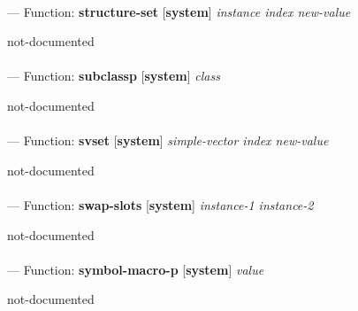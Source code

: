 \paragraph{}
\label{SYSTEM:STRUCTURE-SET}
--- Function: \textbf{structure-set} [\textbf{system}] \textit{instance index new-value}

\begin{adjustwidth}{5em}{5em}
not-documented
\end{adjustwidth}

\paragraph{}
\label{SYSTEM:SUBCLASSP}
--- Function: \textbf{subclassp} [\textbf{system}] \textit{class}

\begin{adjustwidth}{5em}{5em}
not-documented
\end{adjustwidth}

\paragraph{}
\label{SYSTEM:SVSET}
--- Function: \textbf{svset} [\textbf{system}] \textit{simple-vector index new-value}

\begin{adjustwidth}{5em}{5em}
not-documented
\end{adjustwidth}

\paragraph{}
\label{SYSTEM:SWAP-SLOTS}
--- Function: \textbf{swap-slots} [\textbf{system}] \textit{instance-1 instance-2}

\begin{adjustwidth}{5em}{5em}
not-documented
\end{adjustwidth}

\paragraph{}
\label{SYSTEM:SYMBOL-MACRO-P}
--- Function: \textbf{symbol-macro-p} [\textbf{system}] \textit{value}

\begin{adjustwidth}{5em}{5em}
not-documented
\end{adjustwidth}

